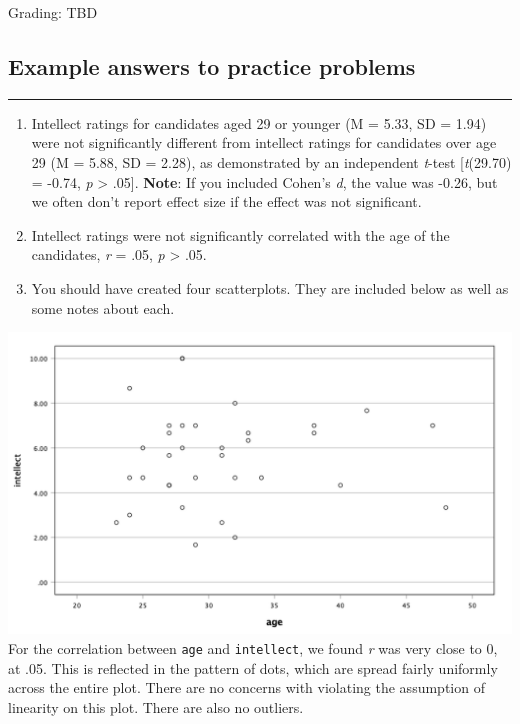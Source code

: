 \documentclass[
]{book}
\begin{document}
Grading: TBD

\hypertarget{example-answers-to-practice-problems}{%
\subsection{Example answers to practice problems}\label{example-answers-to-practice-problems}}

\begin{center}\rule{0.5\linewidth}{0.5pt}\end{center}

\begin{enumerate}
\def\labelenumi{\arabic{enumi}.}
\item
  Intellect ratings for candidates aged 29 or younger (M = 5.33, SD = 1.94) were not significantly different from intellect ratings for candidates over age 29 (M = 5.88, SD = 2.28), as demonstrated by an independent \emph{t}-test {[}\emph{t}(29.70) = -0.74, \emph{p} \textgreater{} .05{]}.
  \textbf{Note}: If you included Cohen's \emph{d}, the value was -0.26, but we often don't report effect size if the effect was not significant.
\item
  Intellect ratings were not significantly correlated with the age of the candidates, \emph{r} = .05, \emph{p} \textgreater{} .05.
\item
  You should have created four scatterplots. They are included below as well as some notes about each.
\end{enumerate}

\includegraphics{img/7.4.31.png}
For the correlation between \texttt{age} and \texttt{intellect}, we found \emph{r} was very close to 0, at .05. This is reflected in the pattern of dots, which are spread fairly uniformly across the entire plot. There are no concerns with violating the assumption of linearity on this plot. There are also no outliers.
\end{document}
